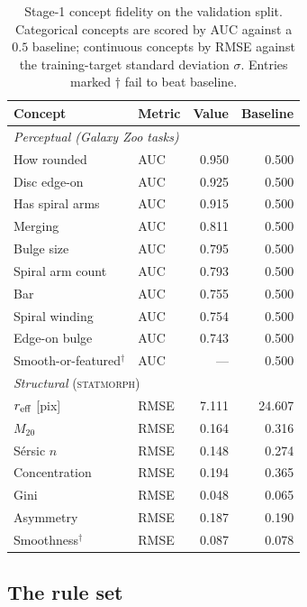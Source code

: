 \documentclass[11pt]{article}
\begin{document}
\begin{table}[htbp]
\centering
\caption{Stage-1 concept fidelity on the validation split. Categorical
concepts are scored by AUC against a $0.5$ baseline; continuous concepts by
RMSE against the training-target standard deviation $\sigma$. Entries marked
$\dagger$ fail to beat baseline.}
\label{tab:fidelity}
\small
\begin{tabular}{llrr}
\toprule
Concept & Metric & Value & Baseline \\
\midrule
\multicolumn{4}{l}{\emph{Perceptual (Galaxy Zoo tasks)}}\\
How rounded          & AUC & 0.950 & 0.500 \\
Disc edge-on         & AUC & 0.925 & 0.500 \\
Has spiral arms      & AUC & 0.915 & 0.500 \\
Merging              & AUC & 0.811 & 0.500 \\
Bulge size           & AUC & 0.795 & 0.500 \\
Spiral arm count     & AUC & 0.793 & 0.500 \\
Bar                  & AUC & 0.755 & 0.500 \\
Spiral winding       & AUC & 0.754 & 0.500 \\
Edge-on bulge        & AUC & 0.743 & 0.500 \\
Smooth-or-featured$^\dagger$ & AUC & --- & 0.500 \\
\midrule
\multicolumn{4}{l}{\textit{Structural} (\textsc{statmorph})}\\
$r_{\rm eff}$ [pix]  & RMSE & 7.111 & 24.607 \\
$M_{20}$             & RMSE & 0.164 & 0.316 \\
Sérsic $n$           & RMSE & 0.148 & 0.274 \\
Concentration        & RMSE & 0.194 & 0.365 \\
Gini                 & RMSE & 0.048 & 0.065 \\
Asymmetry            & RMSE & 0.187 & 0.190 \\
Smoothness$^\dagger$ & RMSE & 0.087 & 0.078 \\
\bottomrule
\end{tabular}
\end{table}

\subsection{The rule set}
\label{sec:rules}
\end{document}
